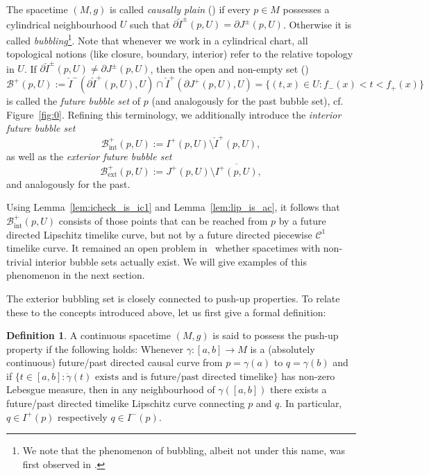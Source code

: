 \documentclass[reqno]{amsart}
\numberwithin{equation}{section}
\theoremstyle{plain}
\theoremstyle{definition}
\newtheorem{definition}[theorem]{Definition}
\theoremstyle{remark}
\begin{document}
The spacetime $(M,g)$ is called \emph{causally plain} (\cite[Def.\ 1.16]{CG:12}) if every
$p\in M$ possesses a cylindrical neighbourhood $U$ such that $\partial \check I^\pm(p,U)=\partial J^\pm(p,U)$.
Otherwise it is called \emph{bubbling}\footnote{We note that the phenomenon of bubbling, albeit not under this name, was first observed in \cite{Chr:91}.}. Note that whenever we work in a cylindrical chart, all 
topological notions (like closure, boundary, interior) refer to the relative topology in $U$.
If $\partial \check I^\pm(p,U)\not=\partial J^\pm(p,U)$, then 
the open and non-empty set (\cite[Prop.\ 1.10 (vi)]{CG:12})
\[
\mathcal{B}^+(p,U) := \check I^-(\partial \check I^+(p,U),U) \cap \check I^+(\partial J^+(p,U),U) = \{(t, x) \in U: f_-(x) < t < 
f_+(x)\}
\]
is called the \emph{future bubble set} of $p$ (and analogously for the past bubble set), cf. Figure~\ref{fig:0}. Refining
this terminology, we additionally introduce the \emph{interior future bubble set}
\[
\mathcal{B}^+_{\mathrm{int}}(p,U) := I^+(p,U) \setminus \check I^+(p,U),
\]
as well as the \emph{exterior future bubble set}
\[
\mathcal{B}^+_{\mathrm{ext}}(p,U) := J^+(p,U) \setminus \overline{I^+(p,U)},
\]
and analogously for the past. 


Using Lemma~\ref{lem:icheck_is_ic1} and Lemma~\ref{lem:lip_is_ac}, 
it follows that $\mathcal{B}^+_{\mathrm{int}}(p,U)$
consists of those points that can be reached from $p$ by a future directed Lipschitz timelike curve, 
but not by a future directed piecewise $\mathcal{C}^1$ timelike curve. It remained an open problem in~\cite{CG:12} whether spacetimes
with non-trivial interior bubble sets actually exist. We will give examples of this phenomenon in the next section.

The exterior bubbling set is closely connected to push-up properties. To relate these to the concepts introduced above, let
us first give a formal definition:
\begin{definition}\label{def:push-up}
A continuous spacetime $(M,g)$ is said to possess the push-up property if the following holds: Whenever $\gamma \colon [a,b]\to M$
is a (absolutely continuous) future/past directed causal curve from $p=\gamma(a)$ to $q=\gamma(b)$ and if $\{t\in [a,b]: 
\dot\gamma(t) \text{ exists and is future/past directed timelike} \}$ has non-zero Lebesgue measure, then in any neighbourhood of $\gamma([a,b])$ 
there exists a future/past directed timelike Lipschitz curve connecting $p$ and $q$. In particular, $q\in I^+(p)$ 
respectively $q\in I^-(p)$.
\end{definition}
\end{document}
